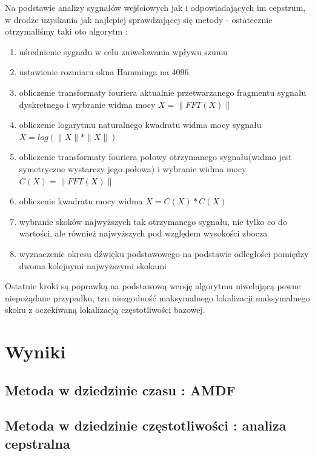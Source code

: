 \documentclass{classrep}
\begin{document}
Na podstawie analizy sygnałów wejściowych jak i odpowiadających im cepstrum, w drodze uzyskania jak najlepiej sprawdzającej się metody - ostatecznie otrzymaliśmy taki oto algorytm :

\begin{enumerate}
\item uśrednienie sygnału w celu zniwelowania wpływu szumu
\item ustawienie rozmiaru okna Hamminga na 4096
\item obliczenie transformaty fouriera aktualnie przetwarzanego fragmentu sygnału dyskretnego i wybranie widma mocy
$X = \| FFT(X) \|$
\item obliczenie logarytmu naturalnego kwadratu widma mocy sygnału
$X = log(\|X\| *\|X\|)$
\item obliczenie transformaty fouriera połowy otrzymanego sygnału(widmo jest symetryczne wystarczy jego połowa) i wybranie widma mocy
$C(X) = \| FFT(X) \|$
\item obliczenie kwadratu mocy widma
$X=C(X)*C(X)$
\item wybranie skoków najwyższych tak otrzymanego sygnału, nie tylko co do wartości, ale również najwyższych pod względem wysokości zbocza
\item wyznaczenie okresu dźwięku podstawowego na podstawie odległości pomiędzy dwoma kolejnymi najwyższymi skokami
\end{enumerate}

Ostatnie kroki są poprawką na podstawową wersję algorytmu niwelującą pewne niepożądane przypadku, tzn niezgodność maksymalnego lokalizacji maksymalnego skoku z oczekiwaną lokalizacją częstotliwości bazowej.


\section{Wyniki}


\subsection{Metoda w dziedzinie czasu : AMDF}

\subsection{Metoda w dziedzinie częstotliwości : analiza cepstralna}
\end{document}
